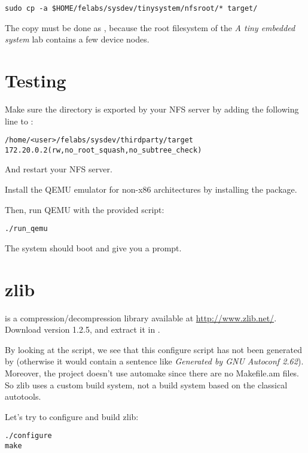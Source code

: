 \begin{verbatim}
sudo cp -a $HOME/felabs/sysdev/tinysystem/nfsroot/* target/
\end{verbatim}

The copy must be done as , because the root filesystem of
the {\em A tiny embedded system} lab contains a few device nodes.

\section{Testing}

Make sure the  directory is exported by your NFS server
by adding the following line to :

\scriptsize
\begin{verbatim}
/home/<user>/felabs/sysdev/thirdparty/target 172.20.0.2(rw,no_root_squash,no_subtree_check)
\end{verbatim}
\normalsize

And restart your NFS server.

Install the QEMU emulator for non-x86 architectures by installing the
 package.

Then, run QEMU with the provided script:

\begin{verbatim}
./run_qemu
\end{verbatim}

The system should boot and give you a prompt.

\section{zlib}

 is a compression/decompression library available at
\url{http://www.zlib.net/}. Download version 1.2.5, and extract it in
.

By looking at the  script, we see that this configure
script has not been generated by  (otherwise it would
contain a sentence like {\em Generated by GNU Autoconf
  2.62}). Moreover, the project doesn't use automake since there are
no Makefile.am files. So zlib uses a custom build system, not a build
system based on the classical autotools.

Let's try to configure and build zlib:

\begin{verbatim}
./configure
make
\end{verbatim}

